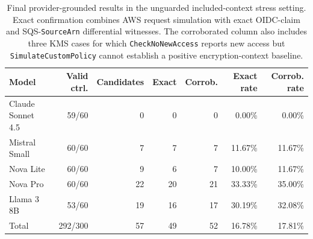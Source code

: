 \begin{table}[t]
\centering
\small
\caption{Final provider-grounded results in the unguarded included-context stress setting. Exact confirmation combines AWS request simulation with exact OIDC-claim and SQS-\texttt{SourceArn} differential witnesses. The corroborated column also includes three KMS cases for which \texttt{CheckNoNewAccess} reports new access but \texttt{SimulateCustomPolicy} cannot establish a positive encryption-context baseline.}
\label{tab:included-context-v6-final}
\begin{tabular}{lrrrrrr}
\toprule
Model & Valid ctrl. & Candidates & Exact & Corrob. & Exact rate & Corrob. rate \\
\midrule
Claude Sonnet 4.5 & 59/60 & 0 & 0 & 0 & 0.00\% & 0.00\% \\
Mistral Small & 60/60 & 7 & 7 & 7 & 11.67\% & 11.67\% \\
Nova Lite & 60/60 & 9 & 6 & 7 & 10.00\% & 11.67\% \\
Nova Pro & 60/60 & 22 & 20 & 21 & 33.33\% & 35.00\% \\
Llama 3 8B & 53/60 & 19 & 16 & 17 & 30.19\% & 32.08\% \\
\midrule
Total & 292/300 & 57 & 49 & 52 & 16.78\% & 17.81\% \\
\bottomrule
\end{tabular}
\end{table}
